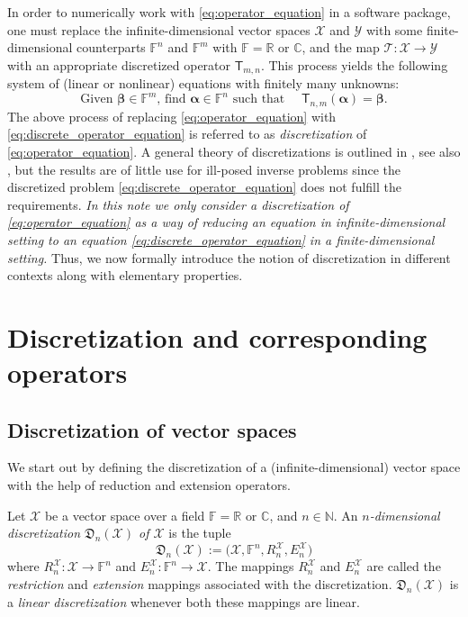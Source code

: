 \documentclass[a4paper]{paper}
\newcommand{\Discr}{\mathfrak{D}}
\newcommand{\VecSpace}[1]{\mathscr{#1}}
\newcommand{\Field}{\mathbb{F}}
\newcommand{\Real}{\mathbb{R}}
\newcommand{\Complex}{\mathbb{C}}
\newcommand{\Natural}{\mathbb{N}}
\newcommand{\Op}[1]{\mathcal{#1}}
\newcommand{\DiscOp}[1]{\mathsf{#1}}
\newcommand*{\EXT}[2]{\ensuremath{E_{#1}^{#2}}}
\newcommand*{\REST}[2]{\ensuremath{R_{#1}^{#2}}}
\newcommand*{\RnX}{\ensuremath{\REST{n}{\VecSpace{X}}}}
\newcommand*{\EnX}{\ensuremath{\EXT{n}{\VecSpace{X}}}}
\newcommand{\valpha}{\boldsymbol{\alpha}}
\newcommand{\vbeta}{\boldsymbol{\beta}}
\begin{document}
In order to numerically work with \eqref{eq:operator_equation} in a software package, one must replace the 
infinite-dimensional vector spaces $\VecSpace{X}$ and $\VecSpace{Y}$ with some finite-dimensional 
counterparts $\Field^{n}$ and $\Field^{m}$ with $\Field = \Real \text{ or } \Complex$, and the map 
$\Op{T} \colon \VecSpace{X} \to \VecSpace{Y}$ with an appropriate discretized operator 
$\DiscOp{T}_{m,n}$. This process yields the following system of (linear or nonlinear) equations
with finitely many unknowns:
%
\begin{equation}
 \label{eq:discrete_operator_equation}
 \text{Given $\vbeta \in \Field^{m}$, find $\valpha \in \Field^{n}$ such that }\quad \DiscOp{T}_{n,m} (\valpha)=\vbeta. 
\end{equation}
%
The above process of replacing \eqref{eq:operator_equation} with \eqref{eq:discrete_operator_equation} is referred to 
as \emph{discretization} of \eqref{eq:operator_equation}. A general theory of discretizations is outlined in 
\cite[Chapter~34]{ZeIIB85}, see also \cite{Pe93}, but the results are of little use for ill-posed inverse 
problems since the discretized problem \eqref{eq:discrete_operator_equation} does not fulfill the requirements.
\emph{In this note we only consider a discretization of \eqref{eq:operator_equation} 
as a way of reducing an equation in infinite-dimensional setting to an equation 
\eqref{eq:discrete_operator_equation} in a finite-dimensional setting.}
Thus, we now formally introduce the notion of discretization in different contexts along with elementary properties.


\section{Discretization and corresponding operators}
\label{sec:discretization_compatibility}

\subsection{Discretization of vector spaces}
\label{subsec:space_discretization}

We start out by defining the discretization of a (infinite-dimensional) vector space with the help of 
reduction and extension operators.

\begin{definition}
 \label{def:space_discretization}
 Let $\VecSpace{X}$ be a vector space over a field $\Field = \Real \text{ or } \Complex$, and $n \in \Natural$.
 An \emph{$n$-dimensional discretization $\Discr_{n}(\VecSpace{X})$ of $\VecSpace{X}$} is the tuple
 \begin{equation*}
  \Discr_{n}(\VecSpace{X}) := \bigl( \VecSpace{X}, \Field^{n}, \RnX, \EnX \bigr) 
 \end{equation*}
 where $\RnX \colon \VecSpace{X} \to \Field^{n}$ and $\EnX \colon \Field^{n} \to \VecSpace{X}$. The mappings $\RnX$ and $\EnX$ are called 
 the \emph{restriction} and \emph{extension} mappings associated with the discretization. $\Discr_n(\VecSpace{X})$ is a \emph{linear 
 discretization} whenever both these mappings are linear.
\end{definition}
\end{document}
